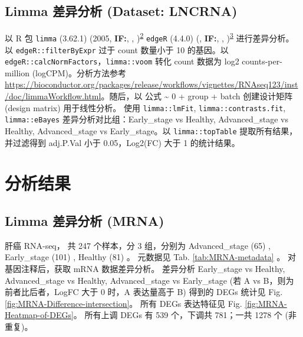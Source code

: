 \documentclass[
]{article}
\begin{document}
\hypertarget{limma-ux5deeux5f02ux5206ux6790-dataset-lncrna}{%
\subsection{Limma 差异分析 (Dataset: LNCRNA)}\label{limma-ux5deeux5f02ux5206ux6790-dataset-lncrna}}

以 R 包 \texttt{limma} (3.62.1) (2005, \textbf{IF:}, , )\textsuperscript{\protect\hyperlink{ref-LimmaLinearMSmyth2005}{2}} \texttt{edgeR} (4.4.0) (, \textbf{IF:}, , )\textsuperscript{\protect\hyperlink{ref-EdgerDifferenChen}{3}} 进行差异分析。以 \texttt{edgeR::filterByExpr} 过于 count 数量小于 10 的基因。以 \texttt{edgeR::calcNormFactors}，\texttt{limma::voom} 转化 count 数据为 log2 counts-per-million (logCPM)。分析方法参考 \url{https://bioconductor.org/packages/release/workflows/vignettes/RNAseq123/inst/doc/limmaWorkflow.html}。随后，以 公式 \textasciitilde{} 0 + group + batch 创建设计矩阵 (design matrix) 用于线性分析。
使用 \texttt{limma::lmFit}, \texttt{limma::contrasts.fit}, \texttt{limma::eBayes} 差异分析对比组：Early\_stage vs Healthy, Advanced\_stage vs Healthy, Advanced\_stage vs Early\_stage。以 \texttt{limma::topTable} 提取所有结果，并过滤得到 adj.P.Val 小于 0.05，\textbar Log2(FC)\textbar{} 大于 1 的统计结果。

\hypertarget{workflow}{%
\section{分析结果}\label{workflow}}

\hypertarget{limma-ux5deeux5f02ux5206ux6790-mrna}{%
\subsection{Limma 差异分析 (MRNA)}\label{limma-ux5deeux5f02ux5206ux6790-mrna}}

肝癌 RNA-seq， 共 247 个样本，分 3 组，分别为 Advanced\_stage (65) , Early\_stage (101) , Healthy (81) 。
元数据见 Tab. \ref{tab:MRNA-metadata} 。
对基因注释后，获取 mRNA 数据差异分析。
差异分析 Early\_stage vs Healthy, Advanced\_stage vs Healthy, Advanced\_stage vs Early\_stage (若 A vs B，则为前者比后者，LogFC 大于 0 时，A 表达量高于 B)
得到的 DEGs 统计见 Fig. \ref{fig:MRNA-Difference-intersection}。
所有 DEGs 表达特征见 Fig. \ref{fig:MRNA-Heatmap-of-DEGs}。
所有上调 DEGs 有 539 个，下调共 781；一共 1278 个 (非重复)。

\begin{center}\vspace{1.5cm}\end{center}
\end{document}
